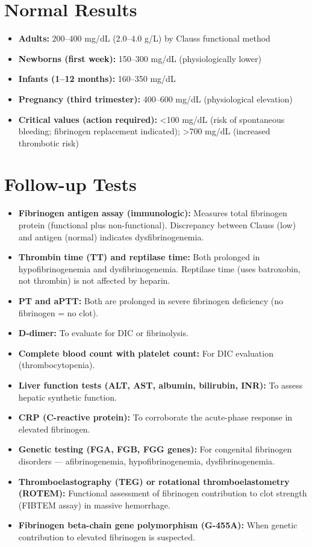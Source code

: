 \section*{Normal Results}
\begin{itemize}
  \item \textbf{Adults:} 200--400 mg/dL (2.0--4.0 g/L) by Clauss functional method
  \item \textbf{Newborns (first week):} 150--300 mg/dL (physiologically lower)
  \item \textbf{Infants (1--12 months):} 160--350 mg/dL
  \item \textbf{Pregnancy (third trimester):} 400--600 mg/dL (physiological elevation)
  \item \textbf{Critical values (action required):} <100 mg/dL (risk of spontaneous bleeding; fibrinogen replacement indicated); >700 mg/dL (increased thrombotic risk)
\end{itemize}

\section*{Follow-up Tests}
\begin{itemize}
  \item \textbf{Fibrinogen antigen assay (immunologic):} Measures total fibrinogen protein (functional plus non-functional). Discrepancy between Clauss (low) and antigen (normal) indicates dysfibrinogenemia.
  \item \textbf{Thrombin time (TT) and reptilase time:} Both prolonged in hypofibrinogenemia and dysfibrinogenemia. Reptilase time (uses batroxobin, not thrombin) is not affected by heparin.
  \item \textbf{PT and aPTT:} Both are prolonged in severe fibrinogen deficiency (no fibrinogen = no clot).
  \item \textbf{D-dimer:} To evaluate for DIC or fibrinolysis.
  \item \textbf{Complete blood count with platelet count:} For DIC evaluation (thrombocytopenia).
  \item \textbf{Liver function tests (ALT, AST, albumin, bilirubin, INR):} To assess hepatic synthetic function.
  \item \textbf{CRP (C-reactive protein):} To corroborate the acute-phase response in elevated fibrinogen.
  \item \textbf{Genetic testing (FGA, FGB, FGG genes):} For congenital fibrinogen disorders --- afibrinogenemia, hypofibrinogenemia, dysfibrinogenemia.
  \item \textbf{Thromboelastography (TEG) or rotational thromboelastometry (ROTEM):} Functional assessment of fibrinogen contribution to clot strength (FIBTEM assay) in massive hemorrhage.
  \item \textbf{Fibrinogen beta-chain gene polymorphism (G-455A):} When genetic contribution to elevated fibrinogen is suspected.
\end{itemize}

